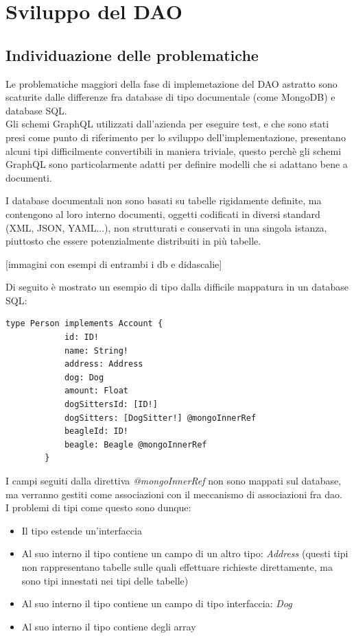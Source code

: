 \documentclass[a4paper, 12pt]{scrartcl}
\begin{document}
  \section*{Sviluppo del DAO}
    \subsection*{Individuazione delle problematiche}
      Le problematiche maggiori della fase di implemetazione del DAO astratto sono scaturite dalle differenze fra database di tipo documentale (come MongoDB) e database SQL.\\
      Gli schemi GraphQL utilizzati dall'azienda per eseguire test, e che sono stati presi come punto di riferimento per lo sviluppo dell'implementazione, presentano alcuni tipi difficilmente convertibili in maniera triviale, questo perchè gli schemi GraphQL sono
      particolarmente adatti per definire modelli che si adattano bene a documenti.

      I database documentali non sono basati su tabelle rigidamente definite, ma contengono al loro interno documenti, oggetti codificati in diversi standard (XML, JSON, YAML...), non strutturati e conservati in una singola istanza, piuttosto che essere potenzialmente distribuiti in più tabelle.
      
      [immagini con esempi di entrambi i db e didascalie]

      Di seguito è mostrato un esempio di tipo dalla difficile mappatura in un database SQL:
      \begin{Verbatim}[samepage=true]
        type Person implements Account {
            id: ID!
            name: String!
            address: Address
            dog: Dog
            amount: Float
            dogSittersId: [ID!]
            dogSitters: [DogSitter!] @mongoInnerRef
            beagleId: ID!
            beagle: Beagle @mongoInnerRef
        }
      \end{Verbatim}

      I campi seguiti dalla direttiva \emph{@mongoInnerRef} non sono mappati sul database, ma verranno gestiti come associazioni con il meccanismo di associazioni fra dao.\\
      I problemi di tipi come questo sono dunque:
      \begin{itemize}
        \item Il tipo estende un'interfaccia
        \item Al suo interno il tipo contiene un campo di un altro tipo: \emph{Address} (questi tipi non rappresentano tabelle sulle quali effettuare richieste direttamente, ma sono tipi innestati nei tipi delle tabelle)
        \item Al suo interno il tipo contiene un campo di tipo interfaccia: \emph{Dog}
        \item Al suo interno il tipo contiene degli array
      \end{itemize}
\end{document}
